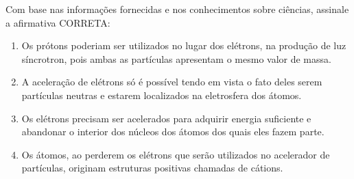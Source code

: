 Com base nas informações fornecidas e nos conhecimentos sobre ciências, assinale a afirmativa CORRETA:


\begin{enumerate}
\item Os prótons poderiam ser utilizados no lugar dos elétrons, na produção de luz síncrotron, pois ambas as
       partículas apresentam o mesmo valor de massa.
\item A aceleração de elétrons só é possível tendo em vista o fato deles serem partículas neutras e estarem
       localizados na eletrosfera dos átomos.
\item Os elétrons precisam ser acelerados para adquirir energia suficiente e abandonar o interior dos núcleos
       dos átomos dos quais eles fazem parte.
\item Os átomos, ao perderem os elétrons que serão utilizados no acelerador de partículas, originam estruturas
       positivas chamadas de cátions.\end{enumerate}
